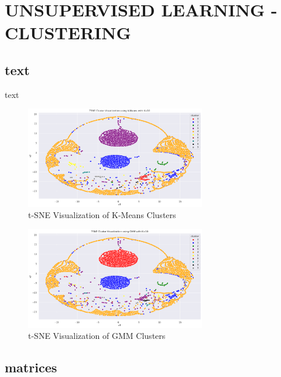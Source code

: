 
\section{UNSUPERVISED LEARNING - CLUSTERING}

    
    \subsection{text} %
    
        text %
    
        \begin{figure}[H]
            \centering
            \includegraphics[width=0.7\textwidth]{../figures/plots/section3/tsne_kmeans_clusters_1.png}
            \caption{t-SNE Visualization of K-Means Clusters}
            \label{fig:tsne_kmeans}
        \end{figure}

        \begin{figure}[H]
            \centering
            \includegraphics[width=0.7\textwidth]{../figures/plots/section3/tsne_gmm_clusters_1.png}
            \caption{t-SNE Visualization of GMM Clusters}
            \label{fig:tsne_gmm}
        \end{figure}
        
    \subsection{matrices} %
    

